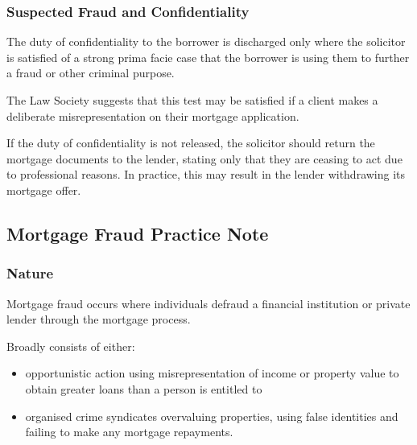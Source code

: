 \documentclass[
]{article}
\newenvironment{Shaded}{}{}
\newcommand{\NormalTok}[1]{#1}
\providecommand{\tightlist}{%
  \setlength{\itemsep}{0pt}\setlength{\parskip}{0pt}}
\begin{document}
\hypertarget{suspected-fraud-and-confidentiality}{%
\subsubsection{Suspected Fraud and
Confidentiality}\label{suspected-fraud-and-confidentiality}}

The duty of confidentiality to the borrower is discharged only where the
solicitor is satisfied of a strong prima facie case that the borrower is
using them to further a fraud or other criminal purpose.

\begin{Shaded}
\begin{Highlighting}[]
\NormalTok{The Law Society suggests that this test may be satisfied if a client makes a deliberate misrepresentation on their mortgage application.}
\end{Highlighting}
\end{Shaded}

If the duty of confidentiality is not released, the solicitor should
return the mortgage documents to the lender, stating only that they are
ceasing to act due to professional reasons. In practice, this may result
in the lender withdrawing its mortgage offer.

\hypertarget{mortgage-fraud-practice-note}{%
\subsection{Mortgage Fraud Practice
Note}\label{mortgage-fraud-practice-note}}

\hypertarget{nature}{%
\subsubsection{Nature}\label{nature}}

Mortgage fraud occurs where individuals defraud a financial institution
or private lender through the mortgage process.

Broadly consists of either:

\begin{itemize}
\tightlist
\item
  opportunistic action using misrepresentation of income or property
  value to obtain greater loans than a person is entitled to
\item
  organised crime syndicates overvaluing properties, using false
  identities and failing to make any mortgage repayments.
\end{itemize}
\end{document}
